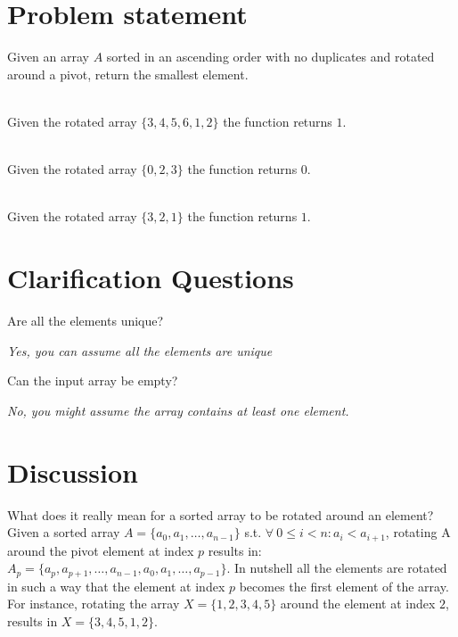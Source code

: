 \section{Problem statement}
\begin{exercise}
Given an array $A$ sorted in an ascending order with no duplicates and rotated around a pivot, return the smallest element.

	\begin{example}
		\hfill \\
		Given the rotated array $\{3,4,5,6,1,2\}$ the function returns $1$.
	\end{example}

	\begin{example}
		\hfill \\
		Given the rotated array $\{0,2,3\}$ the function returns $0$.
	\end{example}

	\begin{example}
		\hfill \\
		Given the rotated array $\{3,2,1\}$ the function returns $1$.
	\end{example}
\end{exercise}

\section{Clarification Questions}

\begin{QandA}
	\item Are all the elements unique? 
	\begin{answered}
		\textit{Yes, you can assume all the elements are unique}
	\end{answered}
	\item Can the input array be empty?
	\begin{answered}
		\textit{No, you might assume the array contains at least one element.}
	\end{answered}
\end{QandA}

\section{Discussion}
\label{min_rotated_array:sec:discussion}
What does it really mean for a sorted array to be rotated around an element? Given a sorted array $A=\{a_0, a_1, \ldots,a_{n-1}\}$ s.t. $ \forall \: 0 \leq i < n: a_i < a_{i+1}$, rotating A around the pivot element at index $p$ results in: $A_p=\{a_p, a_{p+1}, \ldots,a_{n-1}, a_0, a_1, \ldots, a_{p-1}\}$. In  nutshell all the elements are rotated in such a way that the element at index $p$ becomes the first element of the array. For instance, rotating the array $X=\{1,2,3,4,5\}$ around the element at index $2$, results in $X=\{3,4,5,1,2\}$. 

